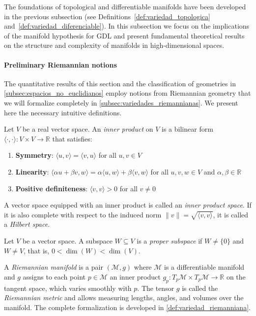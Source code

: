 The foundations of topological and differentiable manifolds have been developed in the previous subsection (see Definitions~\ref{def:variedad_topologica} and~\ref{def:variedad_diferenciable}). In this subsection we focus on the implications of the manifold hypothesis for \gls{GDL} and present fundamental theoretical results on the structure and complexity of manifolds in high-dimensional spaces.

\paragraph{Preliminary Riemannian notions}

The quantitative results of this section and the classification of geometries in \autoref{subsec:espacios_no_euclidianos} employ notions from Riemannian geometry that we will formalize completely in \autoref{subsec:variedades_riemannianas}. We present here the necessary intuitive definitions.

\begin{definition}\label{def:producto_interno}
Let $V$ be a real vector space. An \textit{inner product} on $V$ is a bilinear form $\langle \cdot, \cdot \rangle: V \times V \to \mathbb{R}$ that satisfies:
\begin{enumerate}
	\item \textbf{Symmetry}: $\langle u, v \rangle = \langle v, u \rangle$ for all $u, v \in V$
	\item \textbf{Linearity}: $\langle \alpha u + \beta v, w \rangle = \alpha \langle u, w \rangle + \beta \langle v, w \rangle$ for all $u, v, w \in V$ and $\alpha, \beta \in \mathbb{R}$
	\item \textbf{Positive definiteness}: $\langle v, v \rangle > 0$ for all $v \neq 0$
\end{enumerate}
A vector space equipped with an inner product is called an \textit{inner product space}. If it is also complete with respect to the induced norm $\|v\| = \sqrt{\langle v, v \rangle}$, it is called a \textit{Hilbert space}.
\end{definition}

\begin{definition}\label{def:subespacio_propio}
Let $V$ be a vector space. A subspace $W \subseteq V$ is a \textit{proper subspace} if $W \neq \{0\}$ and $W \neq V$, that is, $0 < \dim(W) < \dim(V)$.
\end{definition}

\begin{definition}\label{def:variedad_riemanniana_preliminar}
A \textit{Riemannian manifold} is a pair $(\mathcal{M}, g)$ where $\mathcal{M}$ is a differentiable manifold and $g$ assigns to each point $p \in \mathcal{M}$ an inner product $g_p: T_p\mathcal{M} \times T_p\mathcal{M} \to \mathbb{R}$ on the tangent space, which varies smoothly with $p$. The tensor $g$ is called the \textit{Riemannian metric} and allows measuring lengths, angles, and volumes over the manifold. The complete formalization is developed in \autoref{def:variedad_riemanniana}.
\end{definition}

